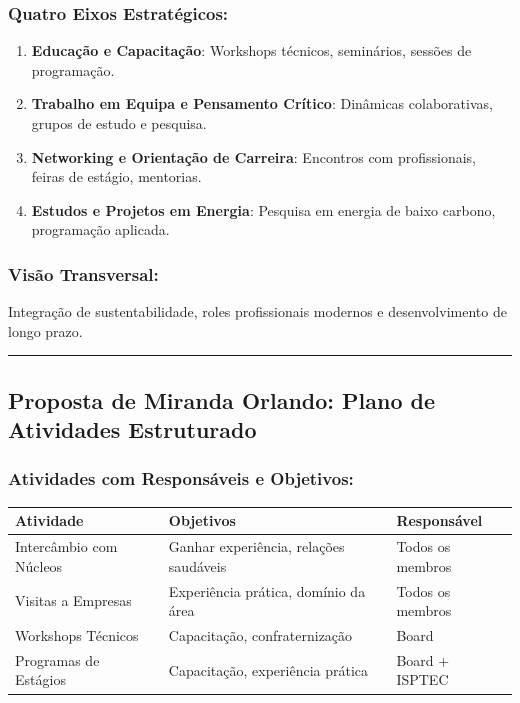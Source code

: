 \documentclass[12pt,a4paper]{article}
\begin{document}
\subsubsection*{Quatro Eixos Estratégicos:}

\begin{enumerate}[itemsep=0.2cm]
    \item \textbf{Educação e Capacitação}: Workshops técnicos, seminários, sessões de programação.
    
    \item \textbf{Trabalho em Equipa e Pensamento Crítico}: Dinâmicas colaborativas, grupos de estudo e pesquisa.
    
    \item \textbf{Networking e Orientação de Carreira}: Encontros com profissionais, feiras de estágio, mentorias.
    
    \item \textbf{Estudos e Projetos em Energia}: Pesquisa em energia de baixo carbono, programação aplicada.
\end{enumerate}

\subsubsection*{Visão Transversal:}
Integração de sustentabilidade, roles profissionais modernos e desenvolvimento de longo prazo.

\textcolor{spe-secondary}{\hspace{0.5cm}\rule{0.4\linewidth}{0.8pt}}
\subsection{Proposta de Miranda Orlando: Plano de Atividades Estruturado}

\subsubsection*{Atividades com Responsáveis e Objetivos:}

\begin{center}
\small
\begin{tabular}{p{3cm}p{4cm}p{3cm}}
\toprule
\textbf{Atividade} & \textbf{Objetivos} & \textbf{Responsável} \\
\midrule
Intercâmbio com Núcleos & Ganhar experiência, relações saudáveis & Todos os membros \\
Visitas a Empresas & Experiência prática, domínio da área & Todos os membros \\
Workshops Técnicos & Capacitação, confraternização & Board \\
Programas de Estágios & Capacitação, experiência prática & Board + ISPTEC \\
\bottomrule
\end{tabular}
\end{center}
\end{document}
